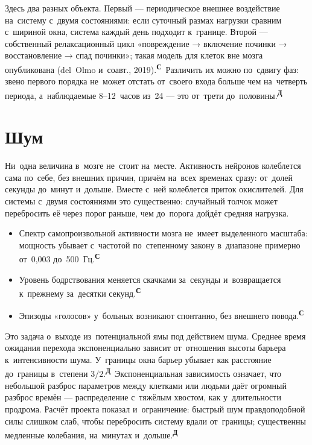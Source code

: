 \documentclass[11pt,a4paper,landscape,twocolumn]{article}
\newcommand{\tS}{\textsuperscript{\sffamily\bfseries\color{cB}С}}
\newcommand{\tD}{\textsuperscript{\sffamily\bfseries\color{cO}Д}}
\newcommand{\facts}{\par\vspace{3pt}{\sffamily\bfseries\small\color{cM}Опорные факты}\par\vspace{-2pt}}
\begin{document}
\begin{ineq}
Здесь два разных объекта. Первый — периодическое внешнее воздействие на~систему с~двумя состояниями: если суточный размах нагрузки сравним с~шириной окна, система каждый день подходит к~границе. Второй — собственный релаксационный цикл «повреждение → включение починки → восстановление → спад починки»; такая модель для клеток вне мозга опубликована (del~Olmo и~соавт., 2019).\tS\ Различить их можно по~сдвигу фаз: звено первого порядка не~может отстать от~своего входа больше чем на~четверть периода, а~наблюдаемые 8–12~часов из~24 — это от~трети до~половины.\tD
\end{ineq}

\section{Шум}
Ни~одна величина в~мозге не~стоит на~месте. Активность нейронов колеблется сама по~себе, без внешних причин, причём на~всех временах сразу: от~долей секунды до~минут и~дольше. Вместе с~ней колеблется приток окислителей. Для системы с~двумя состояниями это существенно: случайный толчок может перебросить её через порог раньше, чем до~порога дойдёт средняя нагрузка.
\facts
\begin{itemize}
\item Спектр самопроизвольной активности мозга не~имеет выделенного масштаба: мощность убывает с~частотой по~степенному закону в~диапазоне примерно от~0,003 до~500~Гц.\tS
\item Уровень бодрствования меняется скачками за~секунды и~возвращается к~прежнему за~десятки секунд.\tS
\item Эпизоды «голосов» у~больных возникают спонтанно, без внешнего повода.\tS
\end{itemize}
\begin{ineq}
Это задача о~выходе из~потенциальной ямы под действием шума. Среднее время ожидания перехода экспоненциально зависит от~отношения высоты барьера к~интенсивности шума. У~границы окна барьер убывает как расстояние до~границы в~степени $3/2$.\tD\ Экспоненциальная зависимость означает, что небольшой разброс параметров между клетками или людьми даёт огромный разброс времён — распределение с~тяжёлым хвостом, как у~длительности продрома. Расчёт проекта показал и~ограничение: быстрый шум правдоподобной силы слишком слаб, чтобы перебросить систему вдали от~границы; существенны медленные колебания, на~минутах и~дольше.\tD
\end{ineq}
\end{document}
